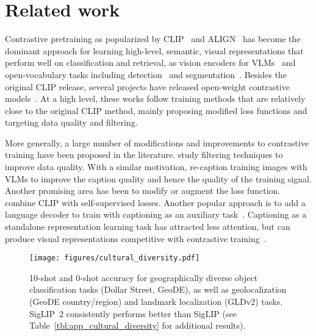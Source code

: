 \section{Related work}
\label{sec:related}

Contrastive pretraining as popularized by CLIP~\cite{clip} and ALIGN~\cite{align} has become the dominant approach for learning high-level, semantic, visual representations that perform well on classification and retrieval, as vision encoders for VLMs~\cite{qwen-vl, blip2, peng2023kosmos, llava1, beyer2024paligemma, mm1, cambrian1} and open-vocabulary tasks including detection~\cite{minderer2022simple, kuo2023open, owlvitv2} and segmentation~\cite{ding2022decoupling, catseg}. Besides the original CLIP release, several projects have released open-weight contrastive models~\cite{ilharco2021open, sun2023eva, siglip, li2023clipa, fang2024dfn, xu2024demystifying}. At a high level, these works follow training methods that are relatively close to the original CLIP method, mainly \cite{siglip} proposing modified loss functions and \cite{fang2024dfn, xu2024demystifying} targeting data quality and filtering.


More generally, a large number of modifications and improvements  to contrastive training have been proposed in the literature. \cite{gadre2024datacomp, fang2024dfn, xu2024demystifying, evansdata, udandarao2024active} study filtering techniques to improve data quality. With a similar motivation, \cite{fan2023improving, nguyen2024improving, lai2024veclip, maninis2024tips} re-caption training images with VLMs to improve the caption quality and hence the quality of the training signal. Another promising area has been to modify or augment the loss function. \cite{mu2022slip, naeem2024silc, maninis2024tips} combine CLIP with self-supervised losses. Another popular approach is to add a language decoder to train with captioning as an auxiliary task~\cite{yu2022coca, blip2}. Captioning as a standalone representation learning task has attracted less attention, but can produce visual representations competitive with contrastive training~\cite{wang2021simvlm, cappa, locca, fini2024multimodal}.

\begin{figure}[t]
    \centering
    \texttt{[image: figures/cultural\_diversity.pdf]}
    \caption{10-shot and 0-shot accuracy for geographically diverse object classification tasks (Dollar Street, GeoDE), as well as geolocalization (GeoDE country/region) and landmark localization (GLDv2) tasks. SigLIP~2 consistently performs better than SigLIP (see Table~\ref{tbl:app_cultural_diversity} for additional results).}
    \label{fig:cultural_diversity}
\end{figure}